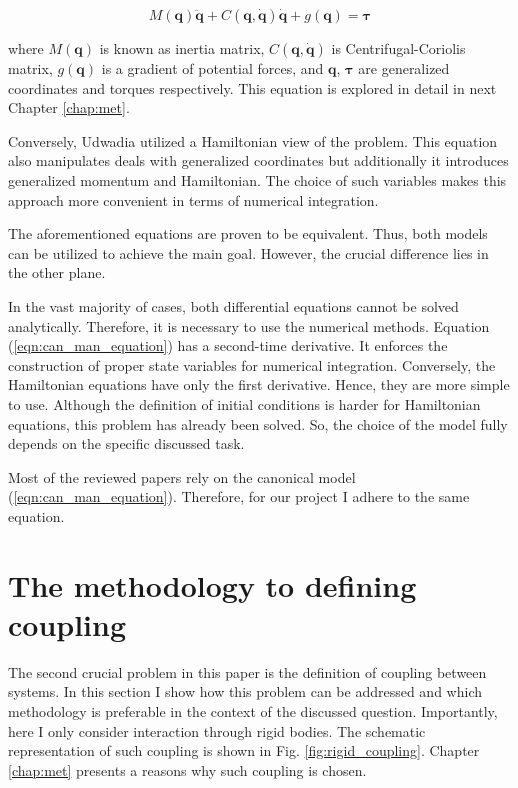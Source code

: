 \begin{equation} \label{eqn:can_man_equation}
   M(\mathbf{q})\ddot{\mathbf{q}} +
   C(\mathbf{q}, \dot{\mathbf{q}}) \dot{\mathbf{q}} +
   g(\mathbf{q}) =
   \boldsymbol{\tau}
\end{equation}


where $M(\mathbf{q})$ is known as inertia matrix, $C(\mathbf{q}, \dot{\mathbf{q}})$
is Centrifugal-Coriolis matrix, $g(\mathbf{q})$ is a gradient
of potential forces, and $\mathbf{q}$, $\boldsymbol{\tau}$ are generalized
coordinates and torques respectively. This equation is explored in detail
in next Chapter \ref{chap:met}.


Conversely, Udwadia \cite{ConstHamiltonSys} utilized a Hamiltonian view of the
problem. This equation also manipulates deals with generalized coordinates but
additionally it introduces generalized momentum and Hamiltonian. The choice of
such variables makes this approach more convenient in terms of numerical
integration.


The aforementioned equations are proven to be equivalent. Thus, both models
can be utilized to achieve the main goal. However, the crucial difference
lies in the other plane.


In the vast majority of cases, both differential equations cannot be solved
analytically. Therefore, it is necessary to use the numerical methods. Equation 
(\ref{eqn:can_man_equation}) has a second-time derivative. It enforces the 
construction of proper state variables for numerical integration. Conversely, 
the Hamiltonian equations have only the first derivative. Hence, they are more 
simple to use. Although the definition of initial conditions is harder for 
Hamiltonian equations, this problem has already been solved. So, the choice of 
the model fully depends on the specific discussed task.


Most of the reviewed papers rely on the canonical model
(\ref{eqn:can_man_equation}). Therefore, for our project I adhere to 
the same equation.


\section{The methodology to defining coupling} \label{sec:interaction_def}


The second crucial problem in this paper is the definition of coupling between
systems. In this section I show how this problem can be addressed and 
which methodology is preferable in the context of the discussed question. Importantly, 
here I only consider interaction through rigid bodies. The schematic representation 
of such coupling is shown in Fig. \ref{fig:rigid_coupling}. Chapter \ref{chap:met} 
presents a reasons why such coupling is chosen.


